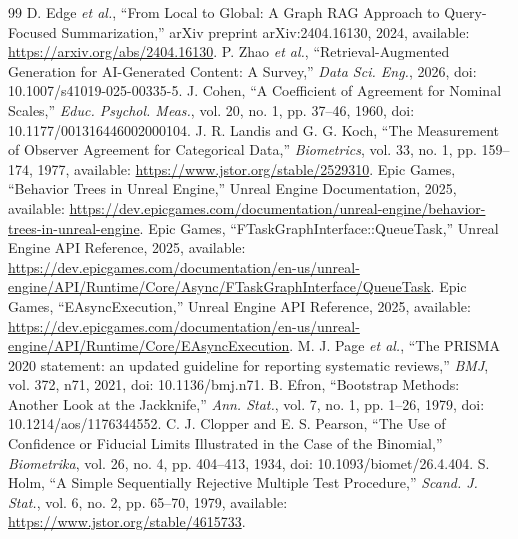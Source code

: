 ﻿\documentclass[a4paper,12pt]{article}
\begin{document}
\begin{thebibliography}{99}
 D. Edge \emph{et al.}, ``From Local to Global: A Graph RAG Approach to Query-Focused Summarization,'' arXiv preprint arXiv:2404.16130, 2024, available: \url{https://arxiv.org/abs/2404.16130}.
 P. Zhao \emph{et al.}, ``Retrieval-Augmented Generation for AI-Generated Content: A Survey,'' \emph{Data Sci. Eng.}, 2026, doi: 10.1007/s41019-025-00335-5.
 J. Cohen, ``A Coefficient of Agreement for Nominal Scales,'' \emph{Educ. Psychol. Meas.}, vol. 20, no. 1, pp. 37--46, 1960, doi: 10.1177/001316446002000104.
 J. R. Landis and G. G. Koch, ``The Measurement of Observer Agreement for Categorical Data,'' \emph{Biometrics}, vol. 33, no. 1, pp. 159--174, 1977, available: \url{https://www.jstor.org/stable/2529310}.
 Epic Games, ``Behavior Trees in Unreal Engine,'' Unreal Engine Documentation, 2025, available: \url{https://dev.epicgames.com/documentation/unreal-engine/behavior-trees-in-unreal-engine}.
 Epic Games, ``FTaskGraphInterface::QueueTask,'' Unreal Engine API Reference, 2025, available: \url{https://dev.epicgames.com/documentation/en-us/unreal-engine/API/Runtime/Core/Async/FTaskGraphInterface/QueueTask}.
 Epic Games, ``EAsyncExecution,'' Unreal Engine API Reference, 2025, available: \url{https://dev.epicgames.com/documentation/en-us/unreal-engine/API/Runtime/Core/EAsyncExecution}.
 M. J. Page \emph{et al.}, ``The PRISMA 2020 statement: an updated guideline for reporting systematic reviews,'' \emph{BMJ}, vol. 372, n71, 2021, doi: 10.1136/bmj.n71.
 B. Efron, ``Bootstrap Methods: Another Look at the Jackknife,'' \emph{Ann. Stat.}, vol. 7, no. 1, pp. 1--26, 1979, doi: 10.1214/aos/1176344552.
 C. J. Clopper and E. S. Pearson, ``The Use of Confidence or Fiducial Limits Illustrated in the Case of the Binomial,'' \emph{Biometrika}, vol. 26, no. 4, pp. 404--413, 1934, doi: 10.1093/biomet/26.4.404.
 S. Holm, ``A Simple Sequentially Rejective Multiple Test Procedure,'' \emph{Scand. J. Stat.}, vol. 6, no. 2, pp. 65--70, 1979, available: \url{https://www.jstor.org/stable/4615733}.
\end{thebibliography}
\end{document}
